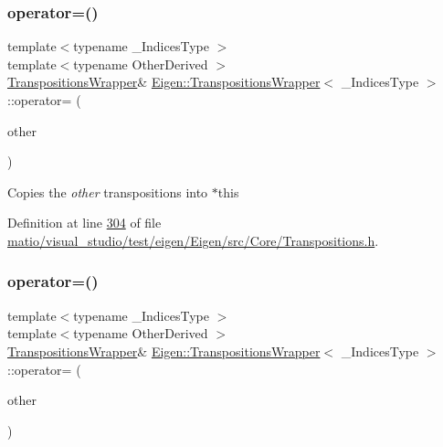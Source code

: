 \subsubsection{\texorpdfstring{operator=()}{operator=()}\hspace{0.1cm}{\footnotesize\ttfamily [1/4]}}
{\footnotesize\ttfamily template$<$typename \+\_\+\+Indices\+Type $>$ \\
template$<$typename Other\+Derived $>$ \\
\hyperlink{class_eigen_1_1_transpositions_wrapper}{Transpositions\+Wrapper}\& \hyperlink{class_eigen_1_1_transpositions_wrapper}{Eigen\+::\+Transpositions\+Wrapper}$<$ \+\_\+\+Indices\+Type $>$\+::operator= (\begin{DoxyParamCaption}\item[{const \hyperlink{class_eigen_1_1_transpositions_base}{Transpositions\+Base}$<$ Other\+Derived $>$ \&}]{other }\end{DoxyParamCaption})\hspace{0.3cm}{\ttfamily [inline]}}

Copies the {\itshape other} transpositions into {\ttfamily $\ast$this} 

Definition at line \hyperlink{matio_2visual__studio_2test_2eigen_2_eigen_2src_2_core_2_transpositions_8h_source_l00304}{304} of file \hyperlink{matio_2visual__studio_2test_2eigen_2_eigen_2src_2_core_2_transpositions_8h_source}{matio/visual\+\_\+studio/test/eigen/\+Eigen/src/\+Core/\+Transpositions.\+h}.

\mbox{\label{class_eigen_1_1_transpositions_wrapper_ac4e1956279759cbda2c9f2784197cfe9}} 
\subsubsection{\texorpdfstring{operator=()}{operator=()}\hspace{0.1cm}{\footnotesize\ttfamily [2/4]}}
{\footnotesize\ttfamily template$<$typename \+\_\+\+Indices\+Type $>$ \\
template$<$typename Other\+Derived $>$ \\
\hyperlink{class_eigen_1_1_transpositions_wrapper}{Transpositions\+Wrapper}\& \hyperlink{class_eigen_1_1_transpositions_wrapper}{Eigen\+::\+Transpositions\+Wrapper}$<$ \+\_\+\+Indices\+Type $>$\+::operator= (\begin{DoxyParamCaption}\item[{const \hyperlink{class_eigen_1_1_transpositions_base}{Transpositions\+Base}$<$ Other\+Derived $>$ \&}]{other }\end{DoxyParamCaption})\hspace{0.3cm}{\ttfamily [inline]}}

